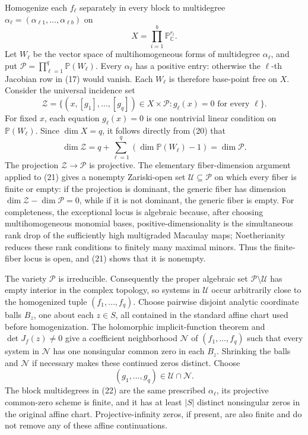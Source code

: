 Homogenize each \(f_\ell\) separately in every block to multidegree \(\alpha_\ell=(\alpha_{\ell1},\ldots,\alpha_{\ell b})\) on
\[
 X=\prod_{i=1}^{b}\mathbb P^{r_i}_{\mathbb C}.
\tag{19}
\]
Let \(W_\ell\) be the vector space of multihomogeneous forms of multidegree \(\alpha_\ell\), and put \(\mathcal P=\prod_{\ell=1}^{q}\mathbb P(W_\ell)\). Every \(\alpha_\ell\) has a positive entry: otherwise the \(\ell\)-th Jacobian row in (17) would vanish. Each \(W_\ell\) is therefore base-point free on \(X\). Consider the universal incidence set
\[
 \mathcal Z=
 \{(x,[g_1],\ldots,[g_q])\in X\times\mathcal P:
       g_\ell(x)=0\text{ for every }\ell\}.
\tag{20}
\]
For fixed \(x\), each equation \(g_\ell(x)=0\) is one nontrivial linear condition on \(\mathbb P(W_\ell)\). Since \(\dim X=q\), it follows directly from (20) that
\[
 \dim\mathcal Z
 =q+\sum_{\ell=1}^{q}(\dim\mathbb P(W_\ell)-1)
 =\dim\mathcal P.
\tag{21}
\]
The projection \(\mathcal Z\to\mathcal P\) is projective. The elementary fiber-dimension argument applied to (21) gives a nonempty Zariski-open set \(\mathcal U\subseteq\mathcal P\) on which every fiber is finite or empty: if the projection is dominant, the generic fiber has dimension \(\dim\mathcal Z-\dim\mathcal P=0\), while if it is not dominant, the generic fiber is empty. For completeness, the exceptional locus is algebraic because, after choosing multihomogeneous monomial bases, positive-dimensionality is the simultaneous rank drop of the sufficiently high multigraded Macaulay maps; Noetherianity reduces these rank conditions to finitely many maximal minors. Thus the finite-fiber locus is open, and (21) shows that it is nonempty.

The variety \(\mathcal P\) is irreducible. Consequently the proper algebraic set \(\mathcal P\setminus\mathcal U\) has empty interior in the complex topology, so systems in \(\mathcal U\) occur arbitrarily close to the homogenized tuple \((f_1,\ldots,f_q)\). Choose pairwise disjoint analytic coordinate balls \(B_z\), one about each \(z\in S\), all contained in the standard affine chart used before homogenization. The holomorphic implicit-function theorem and \(\det J_f(z)\ne0\) give a coefficient neighborhood \(\mathcal N\) of \((f_1,\ldots,f_q)\) such that every system in \(\mathcal N\) has one nonsingular common zero in each \(B_z\). Shrinking the balls and \(\mathcal N\) if necessary makes these continued zeros distinct. Choose
\[
 (g_1,\ldots,g_q)\in\mathcal U\cap\mathcal N.
\tag{22}
\]
The block multidegrees in (22) are the same prescribed \(\alpha_\ell\), its projective common-zero scheme is finite, and it has at least \(|S|\) distinct nonsingular zeros in the original affine chart. Projective-infinity zeros, if present, are also finite and do not remove any of these affine continuations.

